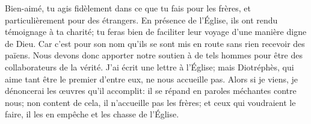 Bien-aimé, tu agis fidèlement dans ce que tu fais pour les frères,
	et particulièrement pour des étrangers.
En présence de l’Église, ils ont rendu témoignage à ta charité;
	tu feras bien de faciliter leur voyage d’une manière digne de Dieu.
Car c’est pour son nom qu’ils se sont mis en route
	sans rien recevoir des païens.
Nous devons donc apporter notre soutien à de tels hommes
	pour être des collaborateurs de la vérité.
J’ai écrit une lettre à l’Église;
	mais Diotréphès, qui aime tant être le premier d’entre eux,
	ne nous accueille pas.
Alors si je viens, je dénoncerai les œuvres qu’il accomplit:
	il se répand en paroles méchantes contre nous;
	non content de cela, il n’accueille pas les frères;
	et ceux qui voudraient le faire,
	il les en empêche et les chasse de l’Église.

